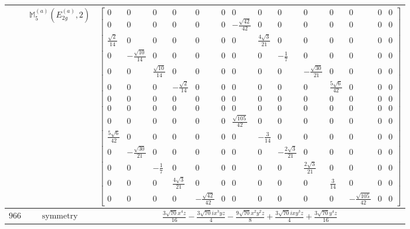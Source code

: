 \documentclass[fleqn,8pt,landscape]{jsarticle}
\begin{document}
\begin{longtable}{ccc}
$  $ & $ \mathbb{M}_{5}^{(a)}(E_{2g}^{(a)},2) $ & $ \begin{bmatrix} 0 & 0 & 0 & 0 & 0 & 0 & 0 & 0 & 0 & 0 & 0 & 0 & 0 & 0 \\ 0 & 0 & 0 & 0 & 0 & 0 & - \frac{\sqrt{42}}{42} & 0 & 0 & 0 & 0 & 0 & 0 & 0 \\ \frac{\sqrt{2}}{14} & 0 & 0 & 0 & 0 & 0 & 0 & \frac{4 \sqrt{3}}{21} & 0 & 0 & 0 & 0 & 0 & 0 \\ 0 & - \frac{\sqrt{10}}{14} & 0 & 0 & 0 & 0 & 0 & 0 & - \frac{1}{7} & 0 & 0 & 0 & 0 & 0 \\ 0 & 0 & \frac{\sqrt{10}}{14} & 0 & 0 & 0 & 0 & 0 & 0 & - \frac{\sqrt{30}}{21} & 0 & 0 & 0 & 0 \\ 0 & 0 & 0 & - \frac{\sqrt{2}}{14} & 0 & 0 & 0 & 0 & 0 & 0 & \frac{5 \sqrt{6}}{42} & 0 & 0 & 0 \\ 0 & 0 & 0 & 0 & 0 & 0 & 0 & 0 & 0 & 0 & 0 & 0 & 0 & 0 \\ 0 & 0 & 0 & 0 & 0 & 0 & 0 & 0 & 0 & 0 & 0 & 0 & 0 & 0 \\ 0 & 0 & 0 & 0 & 0 & 0 & \frac{\sqrt{105}}{42} & 0 & 0 & 0 & 0 & 0 & 0 & 0 \\ \frac{5 \sqrt{6}}{42} & 0 & 0 & 0 & 0 & 0 & 0 & - \frac{3}{14} & 0 & 0 & 0 & 0 & 0 & 0 \\ 0 & - \frac{\sqrt{30}}{21} & 0 & 0 & 0 & 0 & 0 & 0 & - \frac{2 \sqrt{3}}{21} & 0 & 0 & 0 & 0 & 0 \\ 0 & 0 & - \frac{1}{7} & 0 & 0 & 0 & 0 & 0 & 0 & \frac{2 \sqrt{3}}{21} & 0 & 0 & 0 & 0 \\ 0 & 0 & 0 & \frac{4 \sqrt{3}}{21} & 0 & 0 & 0 & 0 & 0 & 0 & \frac{3}{14} & 0 & 0 & 0 \\ 0 & 0 & 0 & 0 & - \frac{\sqrt{42}}{42} & 0 & 0 & 0 & 0 & 0 & 0 & - \frac{\sqrt{105}}{42} & 0 & 0 \end{bmatrix} $ \\ \hline
$ 966 $ & $ \text{symmetry} $ & $ \frac{3 \sqrt{70} x^{4} z}{16} - \frac{3 \sqrt{70} i x^{3} y z}{4} - \frac{9 \sqrt{70} x^{2} y^{2} z}{8} + \frac{3 \sqrt{70} i x y^{3} z}{4} + \frac{3 \sqrt{70} y^{4} z}{16} $ \\

\end{longtable}
\end{document}
